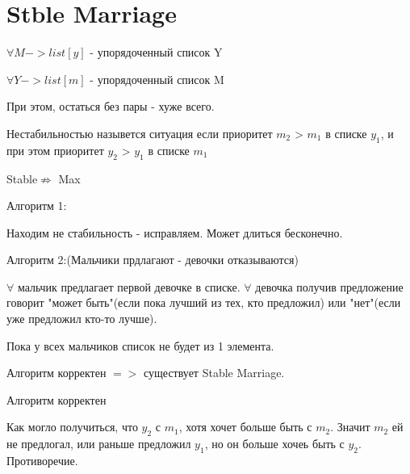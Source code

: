 \section{Stble Marriage}


$\forall M -> list[y]$ - упорядоченный список Y

$\forall Y -> list[m]$ - упорядоченный список M

При этом, остаться без пары - хуже всего.



Нестабильностью назывется ситуация если приоритет $m_2$ > $m_1$ в списке $y_1$, и при этом приоритет $y_2$ > $y_1$ в списке $m_1$

\begin{Rem}
Stable$\nRightarrow$ Max
\end{Rem}

Алгоритм 1:

Находим не стабильность - исправляем. Может длиться бесконечно.

Алгоритм 2:(Мальчики прдлагают - девочки отказываются)

$\forall$ мальчик предлагает первой девочке в списке.
$\forall$ девочка получив предложение говорит "может быть"(если пока лучший из тех, кто предложил) или "нет"(если уже предложил кто-то лучше). 

Пока у всех мальчиков список не будет из 1 элемента.

\begin{Rem}
Алгоритм корректен $=>$ существует Stable Marriage.
\end{Rem}

\begin{theorem}{Алгоритм корректен}


Как могло получиться, что $y_2$ с $m_1$, хотя хочет больше быть с $m_2$. Значит $m_2$ ей не предлогал, или раньше предложил $y_1$, но он больше хочеь быть с $y_2$. Противоречие.
\end{theorem}